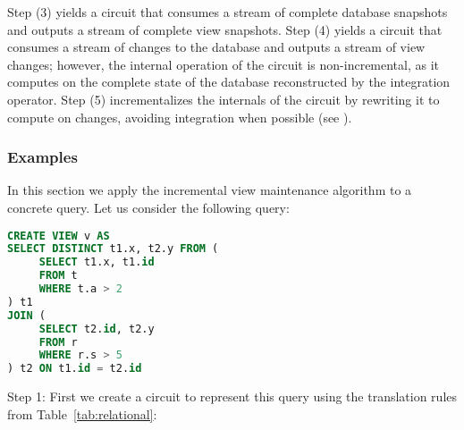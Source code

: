 Step (3) yields a circuit that consumes a stream of complete database snapshots and outputs a
stream of complete view snapshots. Step (4) yields a circuit that consumes a stream of changes
to the database and outputs a stream of view changes; however, the internal operation of the
circuit is non-incremental, as it computes on the complete state of the database reconstructed
by the integration operator.  Step (5) incrementalizes the internals of the circuit by rewriting
it to compute on changes, avoiding integration when possible (see ).

\subsubsection{Examples}

In this section we apply the incremental view maintenance algorithm to a concrete
query.  Let us consider the following query:

\begin{lstlisting}[language=SQL]
CREATE VIEW v AS
SELECT DISTINCT t1.x, t2.y FROM (
     SELECT t1.x, t1.id
     FROM t
     WHERE t.a > 2
) t1
JOIN (
     SELECT t2.id, t2.y
     FROM r
     WHERE r.s > 5
) t2 ON t1.id = t2.id
\end{lstlisting}

Step 1: First we create a \dbsp circuit to represent this query using the
translation rules from Table~\ref{tab:relational}:

\noindent
{}

